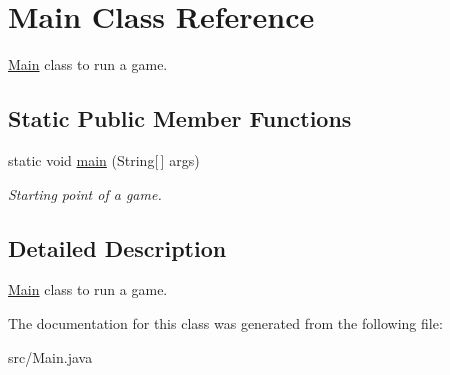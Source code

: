 \hypertarget{classMain}{}\section{Main Class Reference}
\label{classMain}


\hyperlink{classMain}{Main} class to run a game.  


\subsection*{Static Public Member Functions}
\begin{DoxyCompactItemize}
\item 
static void \hyperlink{classMain_a8a5d0f827edddff706cc0e6740d0579a}{main} (String\mbox{[}$\,$\mbox{]} args)\hypertarget{classMain_a8a5d0f827edddff706cc0e6740d0579a}{}\label{classMain_a8a5d0f827edddff706cc0e6740d0579a}

\begin{DoxyCompactList}\small\item\em Starting point of a game. \end{DoxyCompactList}\end{DoxyCompactItemize}


\subsection{Detailed Description}
\hyperlink{classMain}{Main} class to run a game. 

The documentation for this class was generated from the following file\+:\begin{DoxyCompactItemize}
\item 
src/Main.\+java\end{DoxyCompactItemize}
